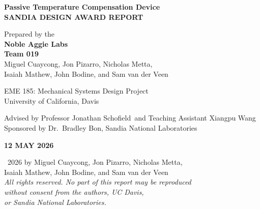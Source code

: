 \documentclass[12pt, letterpaper]{report}%
\newcommand{\projecttitle}{Passive Temperature Compensation Device}
\newcommand{\teamname}{Noble Aggie Labs}
\newcommand{\sponsor}{Dr.\ Bradley Bon}
\newcommand{\organization}{Sandia National Laboratories}
\newcommand{\instructor}{Professor Jonathan Schofield}
\newcommand{\ta}{Teaching Assistant Xiangpu Wang}
\begin{document}
\begin{titlepage}
    \thispagestyle{empty}   %

    \begin{center}
        {\LARGE\bfseries \projecttitle}\\[8pt]
        {\large\bfseries SANDIA DESIGN AWARD REPORT}\\[32pt]

		\vspace{.5in}

        {\large Prepared by the}\\[8pt]
        {\Large\bfseries \teamname}\\[12pt]
		{\Large\bfseries Team 019}\\[12pt]
        {Miguel Cuaycong, Jon Pizarro, Nicholas Metta,}\\
        {Isaiah Mathew, John Bodine, and Sam van der Veen}\\[32pt]

		\vspace{1in}

        {\large EME 185: Mechanical Systems Design Project}\\
        {\large University of California, Davis}\\[24pt]
        
		\vspace{1in}

        {Advised by \instructor\ and \ta}\\
        {Sponsored by {\sponsor}, {\organization}}
    \end{center}

    \vfill

    \begin{center}
        {\large\bfseries 12 MAY 2026}
    \end{center}

    \vspace{0.2in}

    \begin{center}
        {\small
        \textcopyright\ 2026 by Miguel Cuaycong, Jon Pizarro, Nicholas Metta,\\
        Isaiah Mathew, John Bodine, and Sam van der Veen\\[8pt]
        \textit{All rights reserved. No part of this report may be reproduced}\\
        \textit{without consent from the authors, UC Davis,}\\
        \textit{or Sandia National Laboratories.}
        }
    \end{center}
\end{titlepage}
\end{document}
